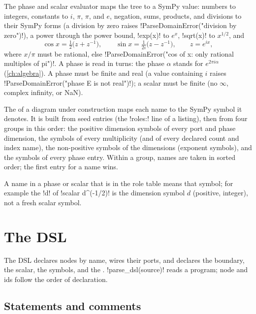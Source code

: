 The phase and scalar evaluator maps the tree to a SymPy value: numbers to integers, constants to $i$, $\pi$, $\pi$, and $e$, negation, sums, products, and divisions to their SymPy forms (a division by zero raises \code!ParseDomainError("division by zero")!), a power through the power bound, \code!exp(x)! to $e^{x}$, \code!sqrt(x)! to $x^{1/2}$, and
\[
\cos x = \tfrac12\bigl(z+z^{-1}\bigr),\qquad \sin x=\tfrac{1}{2i}\bigl(z-z^{-1}\bigr),\qquad z=e^{ix},
\]
where $x/\pi$ must be rational, else \code!ParseDomainError("cos of x: only rational multiples of pi")!. A phase is read in turns: the phase $\alpha$ stands for $e^{2\pi i\alpha}$ (\cref{ch:algebra}). A phase must be finite and real (a value containing $i$ raises \code!ParseDomainError("phase E is not real")!); a scalar must be finite (no $\infty$, complex infinity, or NaN).

\begin{definition}\label{def:language-role-table}
The  of a diagram under construction maps each name to the SymPy symbol it denotes. It is built from seed entries (the \code!roles:! line of a listing), then from four groups in this order: the positive dimension symbols of every port and phase dimension, the symbols of every \bbox{} multiplicity (and of every declared count and index name), the non-positive symbols of the dimensions (exponent symbols), and the symbols of every phase entry. Within a group, names are taken in sorted order; the first entry for a name wins.
\end{definition}

A name in a phase or scalar that is in the role table means that symbol; for example the \code!d! of \code!scalar d^(-1/2)! is the dimension symbol $d$ (positive, integer), not a fresh scalar symbol.

\section{The DSL}\label{sec:language-dsl}

The DSL declares nodes by name, wires their ports, and declares the boundary, the scalar, the symbols, and the \bboxes{}. \py!parse_dsl(source)! reads a program; node and \bbox{} ids follow the order of declaration.

\subsection{Statements and comments}\label{sec:language-dsl-lex}

